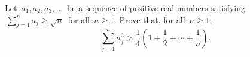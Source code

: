 Let $\, a_1, a_2, a_3, \ldots \,$ be a sequence of positive real numbers satisfying $\, \sum_{j=1}^n a_j \geq \sqrt{n} \,$ for all $\, n \geq 1$. Prove that, for all $\, n \geq 1, \,$ \[ \sum_{j=1}^n a_j^2 > \frac{1}{4} \left( 1 + \frac{1}{2} + \cdots + \frac{1}{n} \right).  \]